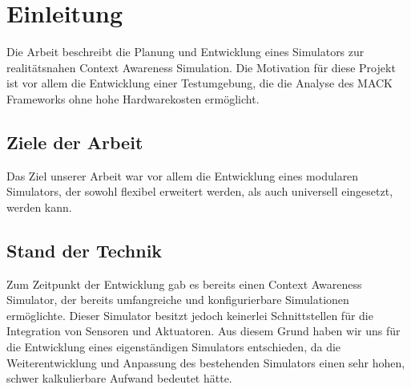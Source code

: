 \chapter{Einleitung}\label{chapter:introduction}


Die Arbeit beschreibt die Planung und Entwicklung eines Simulators zur realitätsnahen Context Awareness Simulation. Die Motivation für diese Projekt ist vor allem die Entwicklung einer Testumgebung, die die Analyse des MACK Frameworks ohne hohe Hardwarekosten ermöglicht.

\section{Ziele der Arbeit}\label{sec:goals}

Das Ziel unserer Arbeit war vor allem die Entwicklung eines modularen Simulators, der sowohl flexibel erweitert werden, als auch universell eingesetzt, werden kann.

\section{Stand der Technik}\label{sec:state_of_art}


Zum Zeitpunkt der Entwicklung gab es bereits einen Context Awareness Simulator, der bereits umfangreiche und konfigurierbare Simulationen ermöglichte. Dieser Simulator besitzt jedoch keinerlei Schnittstellen für die Integration von Sensoren und Aktuatoren. Aus diesem Grund haben wir uns für die Entwicklung eines eigenständigen Simulators entschieden, da die Weiterentwicklung und Anpassung des bestehenden Simulators einen sehr hohen, schwer kalkulierbare Aufwand bedeutet hätte.



